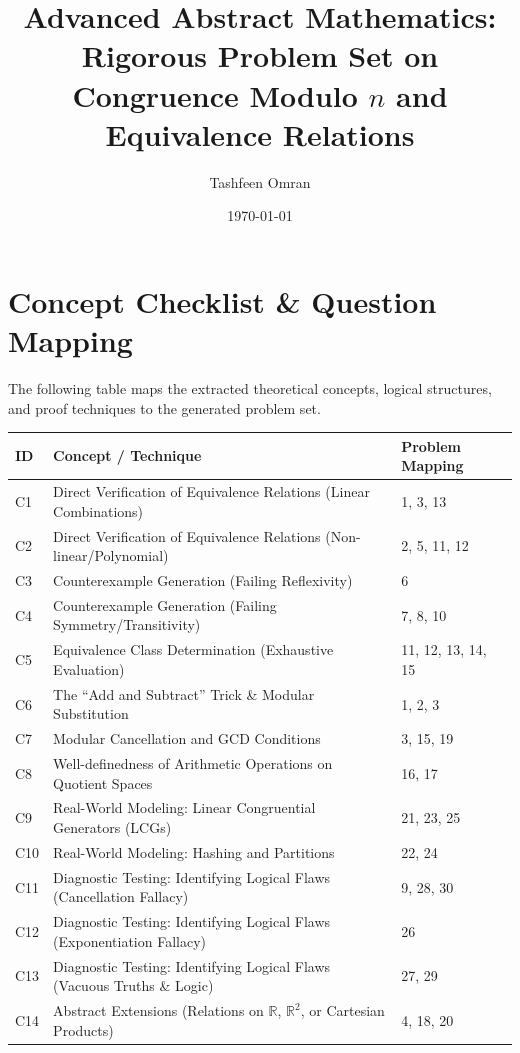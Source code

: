 \documentclass[11pt, a4paper]{article}
\theoremstyle{definition}
\theoremstyle{remark}
\newcommand{\R}{\mathbb{R}}
\begin{document}
\title{\textbf{Advanced Abstract Mathematics:}\\ \Large Rigorous Problem Set on Congruence Modulo $n$ and Equivalence Relations}
\author{Tashfeen Omran}
\date{\today}
\maketitle

\tableofcontents
\newpage

\section{Concept Checklist \& Question Mapping}

The following table maps the extracted theoretical concepts, logical structures, and proof techniques to the generated problem set.

\renewcommand{\arraystretch}{1.5}
\noindent
\begin{tabularx}{\textwidth}{l X l}
\toprule
\textbf{ID} & \textbf{Concept / Technique} & \textbf{Problem Mapping} \\
\midrule
C1 & Direct Verification of Equivalence Relations (Linear Combinations) & 1, 3, 13 \\
C2 & Direct Verification of Equivalence Relations (Non-linear/Polynomial) & 2, 5, 11, 12 \\
C3 & Counterexample Generation (Failing Reflexivity) & 6 \\
C4 & Counterexample Generation (Failing Symmetry/Transitivity) & 7, 8, 10 \\
C5 & Equivalence Class Determination (Exhaustive Evaluation) & 11, 12, 13, 14, 15 \\
C6 & The ``Add and Subtract'' Trick \& Modular Substitution & 1, 2, 3 \\
C7 & Modular Cancellation and GCD Conditions & 3, 15, 19 \\
C8 & Well-definedness of Arithmetic Operations on Quotient Spaces & 16, 17 \\
C9 & Real-World Modeling: Linear Congruential Generators (LCGs) & 21, 23, 25 \\
C10 & Real-World Modeling: Hashing and Partitions & 22, 24 \\
C11 & Diagnostic Testing: Identifying Logical Flaws (Cancellation Fallacy) & 9, 28, 30 \\
C12 & Diagnostic Testing: Identifying Logical Flaws (Exponentiation Fallacy) & 26 \\
C13 & Diagnostic Testing: Identifying Logical Flaws (Vacuous Truths \& Logic) & 27, 29 \\
C14 & Abstract Extensions (Relations on $\R$, $\R^2$, or Cartesian Products) & 4, 18, 20 \\
\bottomrule
\end{tabularx}
\end{document}

